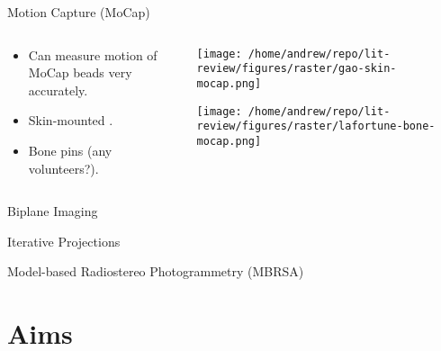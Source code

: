 \documentclass[presentation]{beamer}
\begin{document}
\begin{frame}[label={sec:orgc041cc5}]{Motion Capture (MoCap)}
\begin{columns}
\begin{column}{0.5\columnwidth}
\begin{itemize}
\item Can measure motion of MoCap beads very accurately.
\item Skin-mounted \autocites{gaoInvestigationSoftTissue2008}[][]{kuoInfluenceSoftTissue2011}[][]{linEffectsSoftTissue2016}.
\item Bone pins \autocite{lafortuneThreedimensionalKinematicsHuman1992} (any volunteers?).
\end{itemize}
\end{column}

\begin{column}{0.6\columnwidth}
\begin{center}
\texttt{[image: /home/andrew/repo/lit-review/figures/raster/gao-skin-mocap.png]}
\end{center}
\begin{center}
\texttt{[image: /home/andrew/repo/lit-review/figures/raster/lafortune-bone-mocap.png]}
\end{center}
\end{column}
\end{columns}
\end{frame}
\begin{frame}[label={sec:orgf6e51d7}]{Biplane Imaging}
\end{frame}
\begin{frame}[label={sec:orga3553dc}]{Iterative Projections}
\end{frame}
\begin{frame}[label={sec:orgb35969c}]{Model-based Radiostereo Photogrammetry (MBRSA)}
\end{frame}
\section{Aims}
\label{sec:orgb8ffe45}
\end{document}
